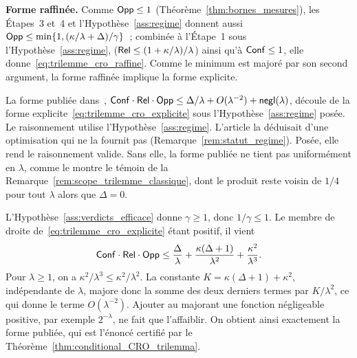 \begin{sloppypar}
\begin{Preuve}
    \textbf{Forme raffin\'ee.} Comme $\mathsf{Opp} \leq 1$
    (Th\'eor\`eme~\ref{thm:bornes_mesures}), les \'Etapes~3 et~4 et l'Hypoth\`ese~\ref{ass:regime}
    donnent aussi $\mathsf{Opp} \leq \min\{1, (\kappa/\lambda+\Delta)/\gamma\}$~;
    combin\'ee \`a l'\'Etape~1 sous l'Hypoth\`ese~\ref{ass:regime},
    ($\mathsf{Rel} \leq (1+\kappa/\lambda)/\lambda$) ainsi qu'\`a $\mathsf{Conf} \leq 1$, elle
    donne~\eqref{eq:trilemme_cro_raffine}. Comme le minimum est major\'e par
    son second argument, la forme raffin\'ee implique la forme explicite.

\end{Preuve}

\begin{remark}
\label{rem:corollaire_publie}
La forme publi\'ee dans~\cite{MINKA2026CRO},
$\mathsf{Conf} \cdot \mathsf{Rel} \cdot \mathsf{Opp} \leq \Delta/\lambda + O(\lambda^{-2}) + \mathsf{negl}(\lambda)$,
d\'ecoule de la forme explicite~\eqref{eq:trilemme_cro_explicite} sous
l'Hypoth\`ese~\ref{ass:regime} pos\'ee. Le raisonnement utilise l'Hypoth\`ese~\ref{ass:regime}.
L'article la d\'eduisait d'une optimisation qui ne la fournit pas
(Remarque~\ref{rem:statut_regime}). Pos\'ee, elle rend le raisonnement
valide. Sans elle, la forme publi\'ee ne tient pas uniform\'ement en $\lambda$, comme le
montre le t\'emoin de la Remarque~\ref{rem:scope_trilemme_classique}, dont le produit
reste voisin de $1/4$ pour tout $\lambda$ alors que $\Delta = 0$.
\end{remark}

\begin{Preuve}
L'Hypoth\`ese~\ref{ass:verdicts_efficace} donne
$\gamma \geq 1$, donc $1/\gamma \leq 1$. Le membre de droite
de~\eqref{eq:trilemme_cro_explicite} \'etant positif, il vient
\begin{equation}
\mathsf{Conf} \cdot \mathsf{Rel} \cdot \mathsf{Opp} \leq \frac{\Delta}{\lambda}
+ \frac{\kappa(\Delta+1)}{\lambda^2} + \frac{\kappa^2}{\lambda^3}.
\end{equation}
Pour $\lambda \geq 1$, on a $\kappa^2/\lambda^3 \leq \kappa^2/\lambda^2$. La constante
$K = \kappa(\Delta+1) + \kappa^2$, ind\'ependante de $\lambda$, majore donc la somme des
deux derniers termes par $K/\lambda^2$, ce qui donne le terme $O(\lambda^{-2})$. Ajouter
au majorant une fonction n\'egligeable positive, par exemple $2^{-\lambda}$, ne fait
que l'affaiblir. On obtient ainsi exactement la forme publi\'ee, qui est l'\'enonc\'e
certifi\'e par le Th\'eor\`eme~\ref{thm:conditional_CRO_trilemma}.
\end{Preuve}


\end{sloppypar}
